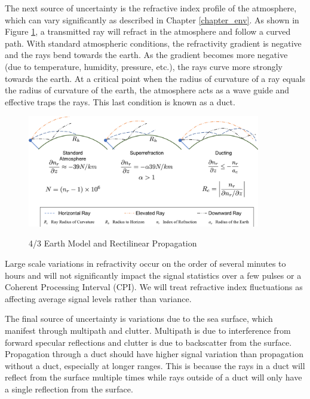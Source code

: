 The next source of uncertainty is the refractive index profile of the atmosphere, which can vary significantly as described in Chapter \ref{chapter_env}. As shown in Figure \ref{rmt_fig:2}, a transmitted ray will refract in the atmosphere and follow a curved path. With standard atmospheric conditions, the refractivity gradient is negative and the rays bend towards the earth. As the gradient becomes more negative (due to temperature, humidity, pressure, etc.), the rays curve more strongly towards the earth. At a critical point when the radius of curvature of a ray equals the radius of curvature of the earth, the atmosphere acts as a wave guide and effective traps the rays. This last condition is known as a duct.
\begin{figure}[H]
  \begin{center}
\includegraphics[width=4in]{../media/multistatic/earth_refractivity.png}
  \end{center}
  \renewcommand{\baselinestretch}{1} \small\normalsize
  \begin{quote}
    \caption[4/3 Earth Model and Rectilinear Propagation]{4/3 Earth Model and Rectilinear Propagation\label{rmt_fig:2}}
  \end{quote}
\end{figure}
\renewcommand{\baselinestretch}{2} \small\normalsize
Large scale variations in refractivity occur on the order of several minutes to hours and will not significantly impact the signal statistics over a few pulses or a Coherent Processing Interval (CPI). We will treat refractive index fluctuations as affecting average signal levels rather than variance.

The final source of uncertainty is variations due to the sea surface, which manifest through multipath and clutter. Multipath is due to interference from forward specular reflections and clutter is due to backscatter from the surface. Propagation through a duct should have higher signal variation than propagation without a duct, especially at longer ranges. This is because the rays in a duct will reflect from the surface multiple times while rays outside of a duct will only have a single reflection from the surface.
